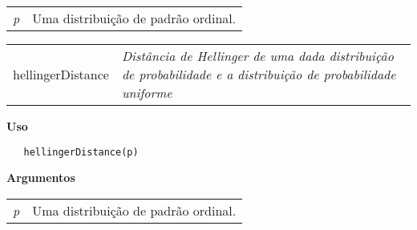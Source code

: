 \documentclass[12pt,letterpaper]{article}
\begin{document}
\begin{table}[!h]
\begin{center}
\begin{tabularx}{\textwidth}{X X}
\hspace{0.5cm} \textit{p} & Uma distribuição de padrão ordinal.\\
\end{tabularx}
\end{center}
\end{table} 

\newpage


\hrulefill   

\begin{table}[!h]
\begin{center}
\begin{tabularx}{\textwidth}{ X X}
\hspace{0.5cm} hellingerDistance & \textit{Distância  de Hellinger de uma dada distribuição de probabilidade e a distribuição de probabilidade uniforme}\\
\end{tabularx}
\end{center}
\end{table} 

\vspace{-0.5cm}

\hrulefill  

\vspace{0.5cm}

\textbf{Uso}

\begin{lstlisting}
   hellingerDistance(p)
\end{lstlisting}

\vspace{0.5cm}

\textbf{Argumentos}

\begin{table}[!h]
\begin{center}
\begin{tabularx}{\textwidth}{X X}
\hspace{0.5cm} \textit{p} & Uma distribuição de padrão ordinal.\\
\end{tabularx}
\end{center}
\end{table} 

\end{document}
